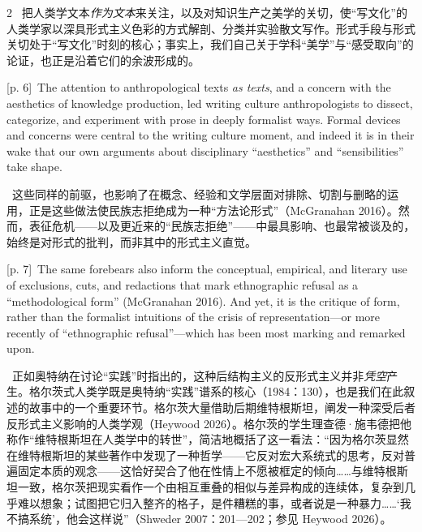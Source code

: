 \documentclass[10pt,a4paper]{article}
\begin{document}
\begin{paracol}{2}
\switchcolumn*
{\scriptsize\color{gray} [p. 6]}\ 把人类学文本\textit{作为文本}来关注，以及对知识生产之美学的关切，使“写文化”的人类学家以深具形式主义色彩的方式解剖、分类并实验散文写作。形式手段与形式关切处于“写文化”时刻的核心；事实上，我们自己关于学科“美学”与“感受取向”的论证，也正是沿着它们的余波形成的。\par
\switchcolumn
{\scriptsize\color{gray} [p. 6]}\ The attention to anthropological texts \textit{as texts}, and a concern with the aesthetics of knowledge production, led writing culture anthropologists to dissect, categorize, and experiment with prose in deeply formalist ways. Formal devices and concerns were central to the writing culture moment, and indeed it is in their wake that our own arguments about disciplinary “aesthetics” and “sensibilities” take shape.\par
\switchcolumn*
{\scriptsize\color{gray} [p. 7]}\ 这些同样的前驱，也影响了在概念、经验和文学层面对排除、切割与删略的运用，正是这些做法使民族志拒绝成为一种“方法论形式”（McGranahan 2016）。然而，表征危机——以及更近来的“民族志拒绝”——中最具影响、也最常被谈及的，始终是对形式的批判，而非其中的形式主义直觉。\par
\switchcolumn
{\scriptsize\color{gray} [p. 7]}\ The same forebears also inform the conceptual, empirical, and literary use of exclusions, cuts, and redactions that mark ethnographic refusal as a “methodological form” (McGranahan 2016). And yet, it is the critique of form, rather than the formalist intuitions of the crisis of representation—or more recently of “ethnographic refusal”—which has been most marking and remarked upon.\par
\switchcolumn*
{\scriptsize\color{gray} [p. 7]}\ 正如奥特纳在讨论“实践”时指出的，这种后结构主义的反形式主义并非\textit{凭空}产生。格尔茨式人类学既是奥特纳“实践”谱系的核心（1984：130），也是我们在此叙述的故事中的一个重要环节。格尔茨大量借助后期维特根斯坦，阐发一种深受后者反形式主义影响的人类学观（Heywood 2026）。格尔茨的学生理查德·施韦德把他称作“维特根斯坦在人类学中的转世”，简洁地概括了这一看法：“因为格尔茨显然在维特根斯坦的某些著作中发现了一种哲学——它反对宏大系统式的思考，反对普遍固定本质的观念——这恰好契合了他在性情上不愿被框定的倾向……与维特根斯坦一致，格尔茨把现实看作一个由相互重叠的相似与差异构成的连续体，复杂到几乎难以想象；试图把它归入整齐的格子，是件糟糕的事，或者说是一种暴力……‘我不搞系统’，他会这样说”（Shweder 2007：201—202；参见 Heywood 2026）。\par
\switchcolumn

\end{paracol}
\end{document}
